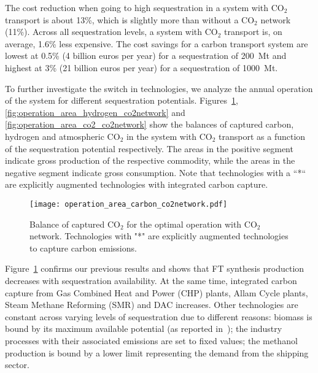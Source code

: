 \documentclass[conference]{IEEEtran}
\newcommand{\carbon}{CO$_2$}
\begin{document}
The cost reduction when going to high sequestration in a system with \carbon{} transport is about 13\%, which is slightly more than without a \carbon{} network (11\%). Across all sequestration levels, a system with \carbon{} transport is, on average, 1.6\% less expensive. The cost savings for a carbon transport system are lowest at 0.5\% (4 billion euros per year) for a sequestration of 200~Mt and highest at 3\% (21 billion euros per year) for a sequestration of 1000~Mt.


To further investigate the switch in technologies, we analyze the annual operation of the system for different sequestration potentials. Figures~\ref{fig:operation_area_carbon_co2network}, \ref{fig:operation_area_hydrogen_co2network} and \ref{fig:operation_area_co2_co2network} show the balances of captured carbon, hydrogen and atmospheric \carbon{} in the system with \carbon{} transport as a function of the sequestration potential respectively. The areas in the positive segment indicate gross production of the respective commodity, while the areas in the negative segment indicate gross consumption.
Note that technologies with a ``*`` are explicitly augmented technologies with integrated carbon capture.
%
\begin{figure}[h]
    \centering
    \texttt{[image: operation\_area\_carbon\_co2network.pdf]}
    \caption{Balance of captured \carbon{} for the optimal operation with \carbon{} network. Technologies with "*" are explicitly augmented technologies to capture carbon emissions.}
    \label{fig:operation_area_carbon_co2network}
\end{figure}


Figure~\ref{fig:operation_area_carbon_co2network} confirms our previous results and shows that FT synthesis production decreases with sequestration availability. At the same time, integrated carbon capture from Gas Combined Heat and Power (CHP) plants, Allam Cycle plants, Steam Methane Reforming (SMR) and DAC increases. Other technologies are constant across varying levels of sequestration due to different reasons: biomass is bound by its maximum available potential (as reported in~\cite{europeancommissionjointresearchcentreENSPRESOBIOMASS2019}); the industry processes with their associated emissions are set to fixed values; the methanol production is bound by a lower limit representing the demand from the shipping sector.
\end{document}
